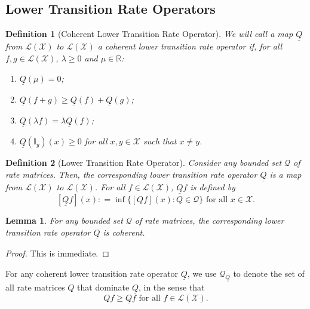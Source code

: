 \documentclass[10pt]{paper}
\newtheorem{lemma}[theorem]{Lemma}
\newtheorem{definition}{Definition}
\newcommand{\reals}{\mathbb{R}}
\newcommand{\states}{\mathcal{X}}
\newcommand{\gambles}{\mathcal{L}}
\newcommand{\gamblesX}{\gambles(\states)}
\newcommand{\ind}[1]{\mathbb{I}_{#1}}
\newcommand{\rateset}{\mathcal{Q}}
\newcommand{\lrate}{\underline{Q}}
\newcommand{\coloneqq}{:\!=}
\begin{document}
\subsection{Lower Transition Rate Operators}

\begin{definition}[Coherent Lower Transition Rate Operator]\label{def:coh_low_trans_rate}
We will call a map $\lrate$ from $\gamblesX$ to $\gamblesX$ a \emph{coherent} lower transition rate operator if, for all $f,g\in\gamblesX$, $\lambda\geq0$ and $\mu\in\reals$:

\vspace{5pt}
\begin{enumerate}[label=LR\arabic*:]
\item
$\lrate(\mu)=0$;
\item
$\lrate(f+g)\geq\lrate(f)+\lrate(g)$;
\item
$\lrate(\lambda f)=\lambda\lrate(f)$;
\item
$\lrate(\ind{y})(x)\geq0$ for all $x,y\in\states$ such that $x\neq y$.
\end{enumerate}
\vspace{5pt}
\end{definition}

\begin{definition}[Lower Transition Rate Operator]\label{def:low_trans_rate}
Consider any bounded set $\rateset$ of rate matrices. Then, the corresponding \emph{lower transition rate operator} $\lrate$ is a map from $\gamblesX$ to $\gamblesX$. For all $f\in\gamblesX$, $\lrate f$ is defined by
\begin{equation}\label{eq:deflowerbound}
\left[\lrate f\right](x)\coloneqq\inf\bigl\{\left[Qf\right](x)\colon Q\in\rateset\bigr\}\text{ for all $x\in\states$}.
\end{equation}
\end{definition}

\begin{lemma}\label{lemma:lrateiscoherent}
For any bounded set $\rateset$ of rate matrices, the corresponding lower transition rate operator $\lrate$ is coherent.
\end{lemma}
\begin{proof}
This is immediate.
\end{proof}

For any coherent lower transition rate operator $\lrate$, we use $\rateset_{\lrate}$ to denote the set of all rate matrices $Q$ that dominate $\lrate$, in the sense that
\begin{equation*}
Qf\geq\lrate f\text{ for all $f\in\gamblesX$.}
\end{equation*}
\end{document}
